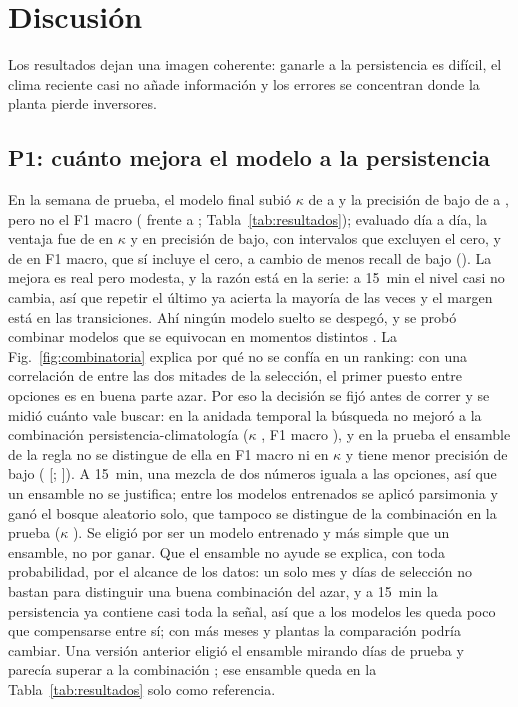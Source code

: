 \documentclass[conference]{IEEEtran}
\begin{document}
\section{Discusi\'on}
Los resultados dejan una imagen coherente: ganarle a la persistencia es dif\'icil, el clima reciente casi no a\~nade informaci\'on y los errores se concentran donde la planta pierde inversores.

\subsection{P1: cu\'anto mejora el modelo a la persistencia}
En la semana de prueba, el modelo final subi\'o $\kappa$ de \tPersKappa{} a \tFinKappa{} y la precisi\'on de bajo de \tPersPrec{} a \tFinPrec{}, pero no el F1 macro (\tPersFmacro{} frente a \tFinFmacro{}; Tabla~\ref{tab:resultados}); evaluado d\'ia a d\'ia, la ventaja fue de \wfFinPersKappa{} en $\kappa$ y \wfFinPersPrec{} en precisi\'on de bajo, con intervalos que excluyen el cero, y de \wfFinPersFmacro{} en F1 macro, que s\'i incluye el cero, a cambio de menos recall de bajo (\wfFinPersRec{}). La mejora es real pero modesta, y la raz\'on est\'a en la serie: a 15~min el nivel casi no cambia, as\'i que repetir el \'ultimo ya acierta la mayor\'ia de las veces y el margen est\'a en las transiciones. Ah\'i ning\'un modelo suelto se despeg\'o, y se prob\'o combinar modelos que se equivocan en momentos distintos \cite{dietterich}. La Fig.~\ref{fig:combinatoria} explica por qu\'e no se conf\'ia en un ranking: con una correlaci\'on de \spearman{} entre las dos mitades de la selecci\'on, el primer puesto entre \nopciones{} opciones es en buena parte azar. Por eso la decisi\'on se fij\'o antes de correr y se midi\'o cu\'anto vale buscar: en la anidada temporal la b\'usqueda no mejor\'o a la combinaci\'on persistencia-climatolog\'ia ($\kappa$ \anidKappa{}, F1 macro \anidFmacro{}), y en la prueba el ensamble de la regla no se distingue de ella en F1 macro ni en $\kappa$ y tiene menor precisi\'on de bajo (\wfRoneCombPrec{} [\wfRoneCombPrecLo{}; \wfRoneCombPrecHi{}]). A 15~min, una mezcla de dos n\'umeros iguala a las \nopciones{} opciones, as\'i que un ensamble no se justifica; entre los modelos entrenados se aplic\'o parsimonia y gan\'o el bosque aleatorio solo, que tampoco se distingue de la combinaci\'on en la prueba ($\kappa$ \wfFinCombKappa{}). Se eligi\'o por ser un modelo entrenado y m\'as simple que un ensamble, no por ganar. Que el ensamble no ayude se explica, con toda probabilidad, por el alcance de los datos: un solo mes y \ndiassel{} d\'ias de selecci\'on no bastan para distinguir una buena combinaci\'on del azar, y a 15~min la persistencia ya contiene casi toda la se\~nal, as\'i que a los modelos les queda poco que compensarse entre s\'i; con m\'as meses y plantas la comparaci\'on podr\'ia cambiar. Una versi\'on anterior eligi\'o el ensamble mirando d\'ias de prueba y parec\'ia superar a la combinaci\'on \cite{cawley}; ese ensamble queda en la Tabla~\ref{tab:resultados} solo como referencia.
\end{document}
